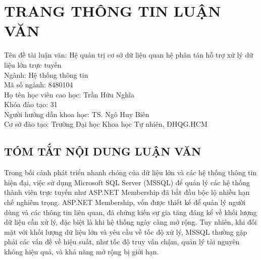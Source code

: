 \documentclass{article}[14pt]
\begin{document}
\pagebreak


{}



\renewcommand{\listtablename}{\centering \MakeUppercase{DANH MỤC CÁC BẢNG SỐ LIỆU}}
\listoftables



\pagebreak

\section*{\centering \MakeUppercase{TRANG THÔNG TIN LUẬN VĂN}}


Tên đề tài luận văn: Hệ quản trị cơ sở dữ liệu quan hệ phân tán hỗ trợ xử lý dữ liệu lớn trực tuyến\\
Ngành: Hệ thống thông tin\\
Mã số ngành: 8480104\\
Họ tên học viên cao học: Trần Hữu Nghĩa\\
Khóa đào tạo: 31\\
Người hướng dẫn khoa học: TS. Ngô Huy Biên\\
Cơ sở đào tạo: Trường Đại học Khoa học Tự nhiên, ĐHQG.HCM


\subsection{TÓM TẮT NỘI DUNG LUẬN VĂN}
Trong bối cảnh phát triển nhanh chóng của dữ liệu lớn và các hệ thống thông tin hiện đại, việc sử dụng Microsoft SQL Server (MSSQL) để quản lý các hệ thống thành viên trực tuyến như ASP.NET Membership đã bắt đầu bộc lộ nhiều hạn chế nghiêm trọng. ASP.NET Membership, vốn được thiết kế để quản lý người dùng và các thông tin liên quan, đã chứng kiến sự gia tăng đáng kể về khối lượng dữ liệu cần xử lý, đặc biệt là khi hệ thống ngày càng mở rộng. Tuy nhiên, khi đối mặt với khối lượng dữ liệu lớn và yêu cầu về tốc độ xử lý, MSSQL thường gặp phải các vấn đề về hiệu suất, như tốc độ truy vấn chậm, quản lý tài nguyên không hiệu quả, và khả năng mở rộng bị giới hạn.
\end{document}
